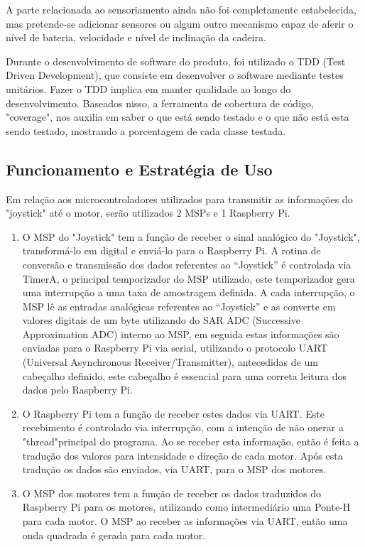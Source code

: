 A parte relacionada ao sensoriamento ainda não foi completamente estabelecida, mas pretende-se adicionar sensores ou algum outro mecanismo capaz de aferir o nível de bateria, velocidade e nível de inclinação da cadeira.

Durante o desenvolvimento de software do produto, foi utilizado o TDD (Test Driven Development), que consiste em desenvolver o software mediante testes unitários. Fazer o TDD implica em manter qualidade ao longo do desenvolvimento. Baseados nisso, a ferramenta de cobertura de código, "coverage", nos auxilia em saber o que está sendo testado e o que não está esta sendo testado, mostrando a porcentagem de cada classe testada.

\subsection{Funcionamento e Estratégia de Uso}

Em relação aos microcontroladores utilizados para transmitir as informações do "joystick" até o motor, serão utilizados 2 MSPs e 1 Raspberry Pi.

\begin{enumerate}
  \item O MSP do "Joystick" tem a função de receber o sinal analógico do "Joystick", transformá-lo em digital e enviá-lo para o Raspberry Pi. A rotina de conversão e transmissão dos dados referentes ao “Joystick” é controlada via TimerA, o principal temporizador do MSP utilizado, este temporizador gera uma interrupção a uma taxa de amostragem definida. A cada interrupção, o MSP lê as entradas analógicas referentes ao “Joystick” e as converte em valores digitais de um byte utilizando do SAR ADC (Successive Approximation ADC) interno ao MSP, em seguida estas informações são enviadas para o Raspberry Pi via serial, utilizando o protocolo UART (Universal Asynchronous Receiver/Transmitter), antecedidas de um cabeçalho definido, este cabeçalho é essencial para uma correta leitura dos dados pelo Raspberry Pi.
  \item O Raspberry Pi tem a função de  receber estes dados via UART. Este recebimento é controlado via interrupção, com a intenção de não onerar a "thread"principal do programa. Ao se receber esta informação, então é feita a tradução dos valores para intensidade e direção de cada motor. Após esta tradução os dados são enviados, via UART, para o MSP dos motores.
  \item O MSP dos motores tem a função de receber os dados traduzidos do Raspberry Pi para os motores, utilizando como intermediário uma Ponte-H para cada motor. O MSP ao receber as informações via UART, então uma onda quadrada é gerada para cada motor.
\end{enumerate}


